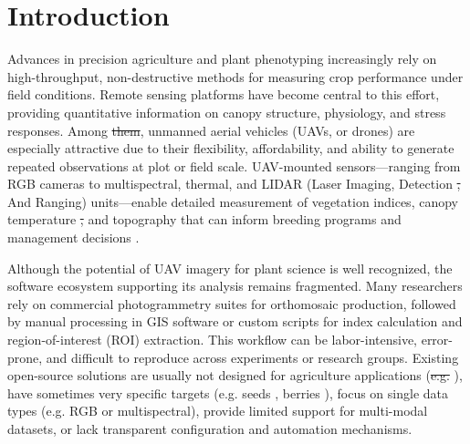 \documentclass[drones,technicalnote,accept,pdftex,moreauthors]{Definitions/mdpi}
\providecommand{\DIFadd}[1]{{\protect\color{blue}\uwave{#1}}} %
\providecommand{\DIFdel}[1]{{\protect\color{red}\sout{#1}}}                      %
\providecommand{\DIFaddbegin}{} %
\providecommand{\DIFaddend}{} %
\providecommand{\DIFdelbegin}{} %
\providecommand{\DIFdelend}{} %
\newcommand{\DIFscaledelfig}{0.5}
\newlength{\DIFdelgraphicswidth} %
\newlength{\DIFdelgraphicsheight} %
\newcommand{\DIFaddincludegraphics}[2][]{{\color{blue}\fbox{\DIFOincludegraphics[#1]{#2}}}} %
\newcommand{\DIFdelincludegraphics}[2][]{%
\sbox{\DIFdelgraphicsbox}{\DIFOincludegraphics[#1]{#2}}%
\settoboxwidth{\DIFdelgraphicswidth}{\DIFdelgraphicsbox} %
\settoboxtotalheight{\DIFdelgraphicsheight}{\DIFdelgraphicsbox} %
\scalebox{\DIFscaledelfig}{%
\parbox[b]{\DIFdelgraphicswidth}{\usebox{\DIFdelgraphicsbox}\\[-\baselineskip] \rule{\DIFdelgraphicswidth}{0em}}\llap{\resizebox{\DIFdelgraphicswidth}{\DIFdelgraphicsheight}{%
\setlength{\unitlength}{\DIFdelgraphicswidth}%
\begin{picture}(1,1)%
\thicklines\linethickness{2pt} %
{\color[rgb]{1,0,0}\put(0,0){\framebox(1,1){}}}%
{\color[rgb]{1,0,0}\put(0,0){\line( 1,1){1}}}%
{\color[rgb]{1,0,0}\put(0,1){\line(1,-1){1}}}%
\end{picture}%
}\hspace*{3pt}}} %
} %
\DeclareRobustCommand{\DIFaddbegin}{\DIFOaddbegin \let\includegraphics\DIFaddincludegraphics} %
\DeclareRobustCommand{\DIFaddend}{\DIFOaddend \let\includegraphics\DIFOincludegraphics} %
\DeclareRobustCommand{\DIFdelbegin}{\DIFOdelbegin \let\includegraphics\DIFdelincludegraphics} %
\DeclareRobustCommand{\DIFdelend}{\DIFOaddend \let\includegraphics\DIFOincludegraphics} %
\begin{document}
\section{Introduction}
\label{intro}
Advances in precision agriculture and plant phenotyping increasingly rely on high-throughput, non-destructive methods for measuring crop performance under field conditions. Remote sensing platforms have become central to this effort, providing quantitative information on canopy structure, physiology, and stress responses. Among \DIFdelbegin \DIFdel{them}\DIFdelend \DIFaddbegin \DIFadd{these}\DIFaddend , unmanned aerial vehicles (UAVs, or drones) are especially attractive due to their flexibility, affordability, and ability to generate repeated observations at plot or field scale. UAV-mounted sensors—ranging from RGB cameras to multispectral, thermal, and LIDAR (Laser Imaging, Detection \DIFdelbegin \DIFdel{, }\DIFdelend And Ranging) units—enable detailed measurement of vegetation indices, canopy temperature \DIFdelbegin \DIFdel{, }\DIFdelend and topography that can inform breeding programs and management decisions \cite{machwitz2021bridging}.

Although the potential of UAV imagery for plant science is well recognized, the software ecosystem supporting its analysis remains fragmented. Many researchers rely on commercial photogrammetry suites for orthomosaic production, followed by manual processing in GIS software or custom scripts for index calculation and region-of-interest (ROI) extraction. This workflow can be labor-intensive, error-prone, and difficult to reproduce across experiments or research groups. Existing open-source solutions are usually not designed for agriculture applications (\DIFdelbegin \DIFdel{e.g. }\DIFdelend \cite{moyroud2018introduction}), have sometimes very specific targets (e.g. seeds \cite{tang2024grabseeds}, berries \cite{loarca2024berryportraits}), focus on single data types (e.g. RGB or multispectral), provide limited support for multi-modal datasets, or lack transparent configuration and automation mechanisms. 
\DIFaddbegin 
\end{document}
